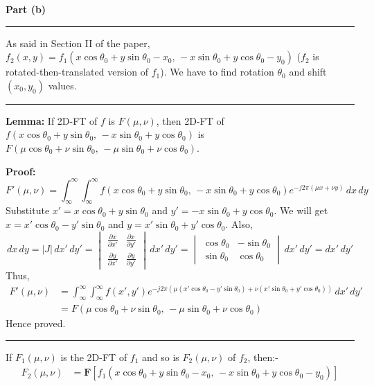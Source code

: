 \documentclass[a4paper,12pt]{article}
\newenvironment{solution}[2][]{%
\begin{mdframed}[linecolor=blue!70!black, linewidth=2pt, roundcorner=10pt, backgroundcolor=yellow!10!white, skipabove=12pt, skipbelow=12pt]%
	\textbf{\large #2}
	\par\noindent\rule{\textwidth}{0.4pt}
}{
\end{mdframed}
}
\begin{document}
\begin{solution}{Part (b)}
	As said in Section II of the paper, $f_2(x, y) = f_1(x \cos \theta_0 + y \sin \theta_0 - x_0, \, - x \sin \theta_0 + y \cos \theta_0 - y_0)$ ($f_2$ is rotated-then-translated version of $f_1$). We have to find rotation $\theta_0$ and shift $(x_0, y_0)$ values.
	\vspace{5pt}
	\hrule
	\vspace{5pt}
	\textbf{Lemma:} If 2D-FT of $f$ is $F(\mu, \nu)$, then 2D-FT of $f(x \cos \theta_0 + y \sin \theta_0, \, - x \sin \theta_0 + y \cos \theta_0)$ is $F(\mu \cos \theta_0 + \nu \sin \theta_0, \, - \mu \sin \theta_0 + \nu \cos \theta_0)$.

	\textbf{Proof:}
	\[
		F'(\mu, \nu) =\int_{\infty}^{\infty} \int_{\infty}^{\infty} f(x \cos \theta_0 + y \sin \theta_0, \, - x \sin \theta_0 + y \cos \theta_0) e^{-j2\pi (\mu x + \nu y)} \, dx \, dy
	\]
	Substitute $x' = x \cos \theta_0 + y \sin \theta_0$ and $y' = - x \sin \theta_0 + y \cos \theta_0$. We will get $x = x' \cos \theta_0 - y' \sin \theta_0$ and $y = x' \sin \theta_0 + y' \cos \theta_0$. Also,
	\[
		dx \, dy = |J| \, dx' \, dy' = \begin{vmatrix}
			\frac{\partial x}{\partial x'} & \frac{\partial x}{\partial y'} \\
			\frac{\partial y}{\partial x'} & \frac{\partial y}{\partial y'}
		\end{vmatrix} \, dx' \, dy' = \begin{vmatrix}
			\cos \theta_0 & -\sin \theta_0 \\
			\sin \theta_0 & \cos \theta_0
		\end{vmatrix} \, dx' \, dy' = dx' \, dy'
	\]
	Thus,
	\begin{align*}
		F'(\mu, \nu) &= \int_{\infty}^{\infty} \int_{\infty}^{\infty} f(x', y') e^{-j2\pi (\mu (x' \cos \theta_0 - y' \sin \theta_0) + \nu (x' \sin \theta_0 + y' \cos \theta_0))} \, dx' \, dy' \\
		&= F(\mu \cos \theta_0 + \nu \sin \theta_0, \, - \mu \sin \theta_0 + \nu \cos \theta_0)
	\end{align*}
	Hence proved.
	\vspace{5pt}
	\hrule
	\vspace{5pt}
	If $F_1(\mu, \nu)$ is the 2D-FT of $f_1$ and so is $F_2(\mu, \nu)$ of $f_2$, then:-
	\begin{align*}
		F_2(\mu, \nu) &= \mathbf{F} [f_1(x \cos \theta_0 + y \sin \theta_0 - x_0, \, - x \sin \theta_0 + y \cos \theta_0 - y_0)] \\

\end{align*}
\end{solution}
\end{document}
